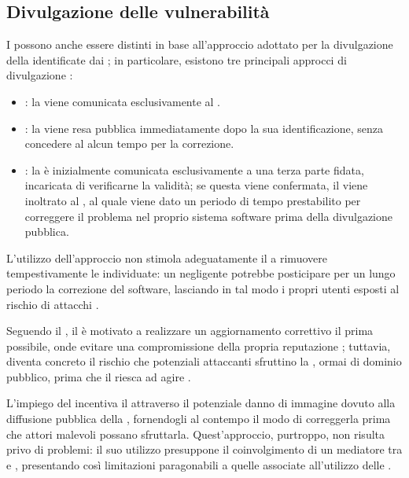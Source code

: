 \subsection{Divulgazione delle vulnerabilità}

I \BBP possono anche essere distinti in base all'approccio adottato per la divulgazione della \vulnerability identificate dai \BH; in particolare, esistono tre principali approcci di divulgazione \cite{lisi2022ard, cavusoglu2007vulndisc}:
\begin{itemize}

\item \FullVendorDisclosure: la \vulnerability viene comunicata esclusivamente al \BI.

\item \FullPublicDisclosure: la \vulnerability viene resa pubblica immediatamente dopo la sua identificazione, senza concedere al \BI alcun tempo per la correzione.

\item \ResponsibleDisclosure: la \vulnerability è inizialmente comunicata esclusivamente a una terza parte fidata, incaricata di verificarne la validità; se questa viene confermata, il \bugreport viene inoltrato al \BI, al quale viene dato un periodo di tempo prestabilito per correggere il problema nel proprio sistema software prima della divulgazione pubblica.
\end{itemize}

L'utilizzo dell'approccio \fullvendordisclosure non stimola adeguatamente il \BI a rimuovere tempestivamente le \vulnerability individuate: un \BI negligente potrebbe posticipare per un lungo periodo la correzione del software, lasciando in tal modo i propri utenti esposti al rischio di attacchi \cite{lisi2022ard, cavusoglu2007vulndisc}.

\medskip

Seguendo il \fullpublicdisclosure, il \BI è motivato a realizzare un aggiornamento correttivo il prima possibile, onde evitare una compromissione della propria reputazione \cite{cavusoglu2007vulndisc, arora2010vulndisc}; tuttavia, diventa concreto il rischio che potenziali attaccanti sfruttino la \vulnerability, ormai di dominio pubblico, prima che il \BI riesca ad agire \cite{lisi2022ard, cavusoglu2007vulndisc, arora2010vulndisc}.

\medskip

L'impiego del \responsibledisclosure incentiva il \BI attraverso il potenziale danno di immagine dovuto alla diffusione pubblica della \vulnerability, fornendogli al contempo il modo di correggerla prima che attori malevoli possano sfruttarla. Quest'approccio, purtroppo, non risulta privo di problemi: il suo utilizzo presuppone il coinvolgimento di un mediatore tra \BI e \BH, presentando così limitazioni paragonabili a quelle associate all'utilizzo delle \bugbountyplatform.

